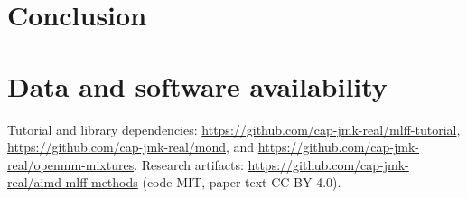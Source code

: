 \documentclass[11pt,a4paper]{article}
\begin{document}
\section{Conclusion}
\label{sec:conclusion}

\section*{Data and software availability}
Tutorial and library dependencies: \url{https://github.com/cap-jmk-real/mlff-tutorial}, \url{https://github.com/cap-jmk-real/mond}, and \url{https://github.com/cap-jmk-real/openmm-mixtures}. Research artifacts: \url{https://github.com/cap-jmk-real/aimd-mlff-methods} (code MIT, paper text CC BY 4.0).



\end{document}
